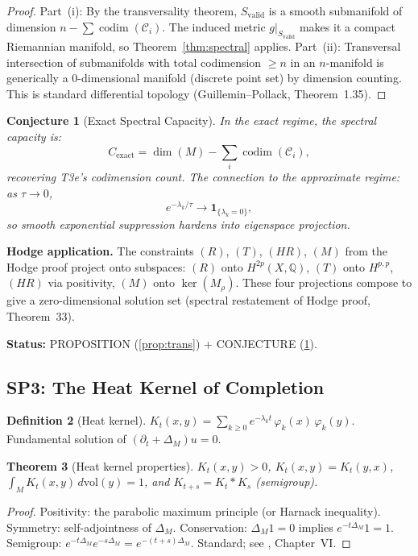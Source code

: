 \documentclass[11pt]{article}
\newtheorem{theorem}{Theorem}[section]
\newtheorem{conjecture}[theorem]{Conjecture}
\theoremstyle{definition}
\newtheorem{definition}[theorem]{Definition}
\theoremstyle{remark}
\newcommand{\dvol}{\,d\mathrm{vol}}
\newcommand{\Cexact}{C_{\mathrm{exact}}}
\begin{document}
\begin{proof}
Part~(i): By the transversality theorem, $S_{\mathrm{valid}}$ is a smooth submanifold of dimension $n - \sum\operatorname{codim}(\mathcal{C}_i)$. The induced metric $g|_{S_{\mathrm{valid}}}$ makes it a compact Riemannian manifold, so Theorem~\ref{thm:spectral} applies. Part~(ii): Transversal intersection of submanifolds with total codimension $\ge n$ in an $n$-manifold is generically a $0$-dimensional manifold (discrete point set) by dimension counting. This is standard differential topology (Guillemin--Pollack, Theorem~1.35).
\end{proof}

\begin{conjecture}[Exact Spectral Capacity]\label{conj:exact}
In the exact regime, the spectral capacity is:
\[
\Cexact = \dim(M) - \sum_i \operatorname{codim}(\mathcal{C}_i),
\]
recovering T3e's codimension count. The connection to the approximate regime: as $\tau \to 0$,
\[
e^{-\lambda_k/\tau} \to \mathbf{1}_{\{\lambda_k = 0\}},
\]
so smooth exponential suppression hardens into eigenspace projection.
\end{conjecture}

\textbf{Hodge application.} The constraints $(R)$, $(T)$, $(HR)$, $(M)$ from the Hodge proof project onto subspaces: $(R)$ onto $H^{2p}(X, \mathbb{Q})$, $(T)$ onto $H^{p,p}$, $(HR)$ via positivity, $(M)$ onto $\ker(M_\rho)$. These four projections compose to give a zero-dimensional solution set (spectral restatement of Hodge proof, Theorem~33).

\textbf{Status:} PROPOSITION (\ref{prop:trans}) + CONJECTURE (\ref{conj:exact}).


\subsection{SP3: The Heat Kernel of Completion}

\begin{definition}[Heat kernel]
$K_t(x, y) = \sum_{k \ge 0} e^{-\lambda_k t}\,\varphi_k(x)\,\varphi_k(y)$. Fundamental solution of $(\partial_t + \Delta_M)u = 0$.
\end{definition}

\begin{theorem}[Heat kernel properties]\label{thm:heat}
$K_t(x,y) > 0$, $K_t(x,y) = K_t(y,x)$, $\int_M K_t(x,y)\dvol(y) = 1$, and $K_{t+s} = K_t * K_s$ (semigroup).
\end{theorem}

\begin{proof}
Positivity: the parabolic maximum principle (or Harnack inequality). Symmetry: self-adjointness of $\Delta_M$. Conservation: $\Delta_M 1 = 0$ implies $e^{-t\Delta_M}1 = 1$. Semigroup: $e^{-t\Delta_M}e^{-s\Delta_M} = e^{-(t+s)\Delta_M}$. Standard; see \cite{Chavel}, Chapter~VI.
\end{proof}
\end{document}
